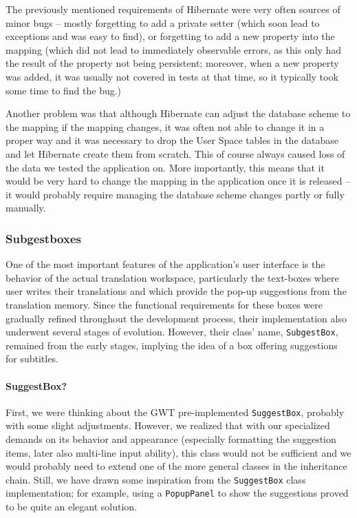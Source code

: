 The previously mentioned requirements of Hibernate were very often sources of minor bugs -- mostly forgetting to add a private setter (which soon lead to exceptions and was easy to find), or forgetting to add a new property into the mapping (which did not lead to immediately observable errors, as this only had the result of the property not being persistent; moreover, when a new property was added, it was usually not covered in tests at that time, so it typically took some time to find the bug.)

Another problem was that although Hibernate can adjust the database scheme to the mapping if the mapping changes, it was often not able to change it in a proper way and it was necessary to drop the User Space tables in the database and let Hibernate create them from scratch. This of course always caused loss of the data we tested the application on. More importantly, this means that it would be very hard to change the mapping in the application once it is released -- it would probably require managing the database scheme changes partly or fully manually.



\subsubsection{Subgestboxes}

One of the most important features of the application's user interface is the behavior of the actual translation workspace, particularly the text-boxes where user writes their translations and which provide the pop-up suggestions from the translation memory. Since the functional requirements for these boxes were gradually refined throughout the development process, their implementation also underwent several stages of evolution. However, their class' name, {\tt SubgestBox}, remained from the early stages, implying the idea of a box offering suggestions for subtitles.

\paragraph{SuggestBox?}
First, we were thinking about the GWT pre-implemented {\tt SuggestBox}, probably with some slight adjustments. However, we realized that with our specialized demands on its behavior and appearance (especially formatting the suggestion items, later also multi-line input ability), this class would not be sufficient and we would probably need to extend one of the more general classes in the inheritance chain. Still, we have drawn some inspiration from the {\tt SuggestBox} class implementation; for example, using a {\tt PopupPanel} to show the suggestions proved to be quite an elegant solution.

